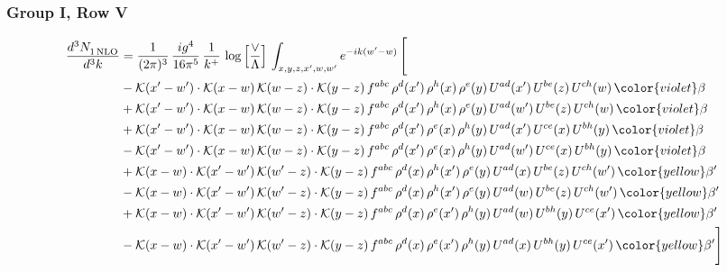 \subsubsection{Group I, Row V}
\begin{align}
    \frac{d^{3}N_{1\,\rm NLO}^{\rm}}{d^{3}k}  & = \frac{1}{(2\pi)^{3}}\, \frac{ig^{4}}{16\pi^{5}}\, \frac{1}{k^{+}}\, \log{\left[\frac{\vee}{\Lambda}\right]}\, \int_{x,y,z,x^{\prime},w,w^{\prime}}e^{-ik(w^{\prime}-w)}\, \Bigg[\notag \\ & -\mathcal{K}(x'-w')\cdot \mathcal{K}(x-w)\, \mathcal{K}(w-z)\cdot \mathcal{K}(y-z)\,f^{abc}\,\rho^{d}(x')\,\rho^{h}(x)\,\rho^{e}(y)\,U^{ad}(x')\,U^{be}(z)\,U^{ch}(w)\,{\color{violet} \beta}\notag \\ & + \mathcal{K}(x'-w')\cdot \mathcal{K}(x-w)\, \mathcal{K}(w-z)\cdot \mathcal{K}(y-z)\,f^{abc}\,\rho^{d}(x')\,\rho^{h}(x)\,\rho^{e}(y)\,U^{ad}(w')\,U^{be}(z)\,U^{ch}(w)\,{\color{violet} \beta}\notag \\ & +\mathcal{K}(x'-w')\cdot \mathcal{K}(x-w)\, \mathcal{K}(w-z)\cdot \mathcal{K}(y-z)\,f^{abc}\,\rho^{d}(x')\,\rho^{e}(x)\,\rho^{h}(y)\,U^{ad}(x')\,U^{ce}(x)\,U^{bh}(y)\,{\color{violet} \beta}\notag \\ & -\mathcal{K}(x'-w')\cdot \mathcal{K}(x-w)\, \mathcal{K}(w-z)\cdot \mathcal{K}(y-z)\,f^{abc}\,\rho^{d}(x')\,\rho^{e}(x)\,\rho^{h}(y)\,U^{ad}(w')\,U^{ce}(x)\,U^{bh}(y)\,{\color{violet} \beta}\notag \\ & + \mathcal{K}(x-w)\cdot \mathcal{K}(x'-w')\,\mathcal{K}(w'-z)\cdot \mathcal{K}(y-z)\,f^{abc}\,\rho^{d}(x)\,\rho^{h}(x')\,\rho^{e}(y)\,U^{ad}(x)\,U^{be}(z)\,U^{ch}(w')\,{\color{yellow}\beta'}\notag \\ & - \mathcal{K}(x-w)\cdot \mathcal{K}(x'-w')\,\mathcal{K}(w'-z)\cdot \mathcal{K}(y-z)\,f^{abc}\,\rho^{d}(x)\,\rho^{h}(x')\,\rho^{e}(y)\,U^{ad}(w)\,U^{be}(z)\,U^{ch}(w')\,{\color{yellow}\beta'}\notag \\ & + \mathcal{K}(x-w)\cdot \mathcal{K}(x'-w')\,\mathcal{K}(w'-z)\cdot \mathcal{K}(y-z)\,f^{abc}\,\rho^{d}(x)\,\rho^{e}(x')\,\rho^{h}(y)\,U^{ad}(w)\,U^{bh}(y)\,U^{ce}(x')\,{\color{yellow}\beta'}\notag \\ & -\mathcal{K}(x-w)\cdot \mathcal{K}(x'-w')\,\mathcal{K}(w'-z)\cdot \mathcal{K}(y-z)\,f^{abc}\,\rho^{d}(x)\,\rho^{e}(x')\,\rho^{h}(y)\,U^{ad}(x)\,U^{bh}(y)\,U^{ce}(x')\,{\color{yellow}\beta'} \Bigg]
\end{align}
